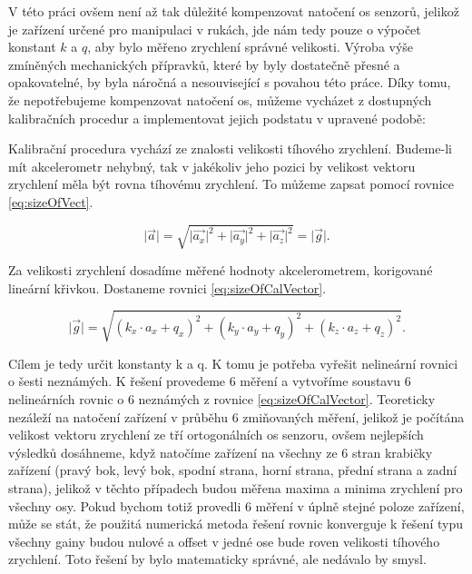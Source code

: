 V této práci ovšem není až tak důležité kompenzovat natočení os senzorů, jelikož je zařízení určené pro manipulaci v rukách, jde nám tedy pouze o výpočet konstant $ k $ a $ q $, aby bylo měřeno zrychlení správné velikosti. Výroba výše zmíněných mechanických přípravků, které by byly dostatečně přesné a opakovatelné, by byla náročná a nesouvisející s povahou této práce. Díky tomu, že nepotřebujeme kompenzovat natočení os, můžeme vycházet z dostupných kalibračních procedur a implementovat jejich podstatu v upravené podobě:

Kalibrační procedura vychází ze znalosti velikosti tíhového zrychlení. Budeme-li mít akcelerometr nehybný, tak v jakékoliv jeho pozici by velikost vektoru zrychlení měla být rovna tíhovému zrychlení. To můžeme zapsat pomocí rovnice \ref{eq:sizeOfVect}.

\begin{equation} \label{eq:sizeOfVect}
\lvert\vec{a}\rvert=\sqrt{\lvert\vec{a_{x}}\rvert^{2}+\lvert\vec{a_{y}}\rvert^{2}+\lvert\vec{a_{z}}\rvert^{2}}=\lvert\vec{g}\rvert .
\end{equation} 

Za velikosti zrychlení dosadíme měřené hodnoty akcelerometrem, korigované lineární křivkou. Dostaneme rovnici \ref{eq:sizeOfCalVector}.

\begin{equation} \label{eq:sizeOfCalVector}
\lvert\vec{g}\rvert=\sqrt{(k_{x}\cdot a_{x} + q_{x})^{2}+(k_{y}\cdot a_{y} + q_{y})^{2}+(k_{z}\cdot a_{z} + q_{z})^{2}} .
\end{equation} 

Cílem je tedy určit konstanty k a q. K tomu je potřeba vyřešit nelineární rovnici o šesti neznámých. K řešení provedeme 6 měření a vytvoříme soustavu 6 nelineárních rovnic o 6 neznámých z rovnice \ref{eq:sizeOfCalVector}. Teoreticky nezáleží na natočení zařízení v průběhu 6 zmiňovaných měření, jelikož je počítána velikost vektoru zrychlení ze tří ortogonálních os senzoru, ovšem nejlepších výsledků dosáhneme, když natočíme zařízení na všechny ze 6 stran krabičky zařízení (pravý bok, levý bok, spodní strana, horní strana, přední strana a zadní strana), jelikož v těchto případech budou měřena maxima a minima zrychlení pro všechny osy. Pokud bychom totiž provedli 6 měření v úplně stejné poloze zařízení, může se stát, že použitá numerická metoda řešení rovnic konverguje k řešení typu všechny gainy budou nulové a offset v jedné ose bude roven velikosti tíhového zrychlení. Toto řešení by bylo matematicky správné, ale nedávalo by smysl.

